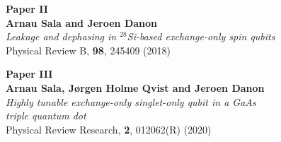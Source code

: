 \documentclass[11pt,b5paper]{memoir} %
\begin{document}
\cleardoublepage
\thispagestyle{empty}
\begin{vplace}[0.7]
\begin{center}
\textbf{\huge Paper II}\\
\vspace{4ex}
\textbf{Arnau Sala and Jeroen Danon}\\
\vspace{2ex}
\textit{Leakage and dephasing in $^{28}$Si-based exchange-only spin qubits}\\
\vspace{2ex}
Physical Review B, \textbf{98}, 245409 (2018)
\end{center}
\end{vplace}
\cleardoublepage



\cleardoublepage
\thispagestyle{empty}
\begin{vplace}[0.7]
\begin{center}
\textbf{\huge Paper III}\\
\vspace{4ex}
\textbf{Arnau Sala, J{\o}rgen Holme Qvist and Jeroen Danon}\\
\vspace{2ex}
\textit{Highly tunable exchange-only singlet-only qubit in a GaAs \\triple quantum dot}\\
\vspace{2ex}
Physical Review Research, \textbf{2}, 012062(R) (2020)
\end{center}
\end{vplace}
\cleardoublepage

\end{document}
